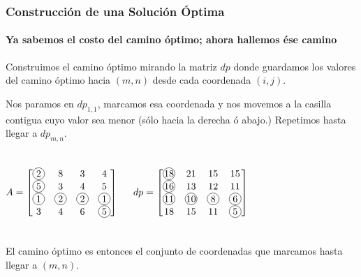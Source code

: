 \documentclass[spanish]{beamer}
\newcommand*\circledcolor[3]{\tikz[baseline=(char.base)]{
    \node[shape=circle,draw,inner sep=1pt,color=#2, #3] (char) {\hphantom{00}};
    \node[inner sep=1pt] (char) {#1};
}}
\newcommand*\circled[1]{\circledcolor{#1}{black}{solid}}
\begin{document}
    \begin{frame}
        \frametitle{Construcción de una Solución Óptima}
        \framesubtitle{Ya sabemos el costo del camino óptimo; ahora hallemos ése camino}

        Construimos el camino óptimo mirando la matriz $dp$ donde guardamos los valores del camino óptimo hacia $(m, n)$ desde cada coordenada $(i, j)$.

        \vspace{1em}

        Nos paramos en $dp_{1,1}$, marcamos esa coordenada y nos movemos a la casilla contigua cuyo valor sea menor (sólo hacia la derecha ó abajo.) Repetimos hasta llegar a $dp_{m,n}$.

        \begin{columns}
            $$
            A =
            \begin{bmatrix}
                \circled{2} & 8           & 3           & 4 \\
                \circled{5} & 3           & 4           & 5 \\
                \circled{1} & \circled{2} & \circled{2} & \circled{1} \\
                3           & 4           & 6           & \circled{5}
            \end{bmatrix}
            $$

            $$
            dp =
            \begin{bmatrix}
                \circled{18} & 21           & 15          & 15 \\
                \circled{16} & 13           & 12          & 11 \\
                \circled{11} & \circled{10} & \circled{8} & \circled{6} \\
                18           & 15           & 11          & \circled{5}
            \end{bmatrix}
            $$
        \end{columns}

        \vspace{1em}

        El camino óptimo es entonces el conjunto de coordenadas que marcamos hasta llegar a $(m, n)$.
    \end{frame}
\end{document}
